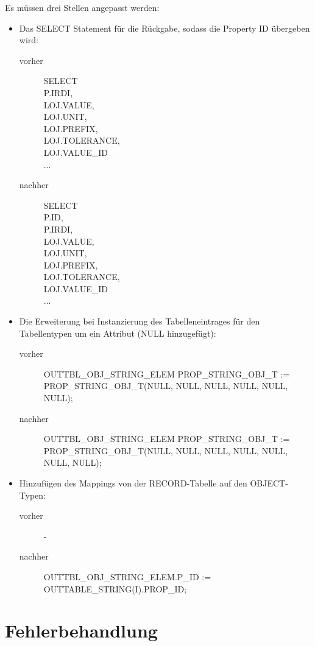 Es müssen drei Stellen angepasst werden: 

\begin{itemize}
\item Das SELECT Statement für die Rückgabe, sodass die Property ID übergeben wird: 
  \begin{description}
  \item[vorher] SELECT \\
  P.IRDI, \\
  LOJ.VALUE, \\ 
  LOJ.UNIT, \\
  LOJ.PREFIX, \\ 
  LOJ.TOLERANCE, \\
  LOJ.VALUE\_ID \\
  ...
  \item[nachher] SELECT \\
  P.ID, \\
  P.IRDI, \\ 
  LOJ.VALUE, \\ 
  LOJ.UNIT, \\
  LOJ.PREFIX, \\ 
  LOJ.TOLERANCE, \\ 
  LOJ.VALUE\_ID \\
  ...
  \end{description}
\item Die Erweiterung bei Instanzierung des Tabelleneintrages für den Tabellentypen um ein Attribut (NULL hinzugefügt): 
  \begin{description}
  \item[vorher] OUTTBL\_OBJ\_STRING\_ELEM  PROP\_STRING\_OBJ\_T :=  \\
  PROP\_STRING\_OBJ\_T(NULL, NULL, NULL, NULL, NULL, NULL);
  \item[nachher] OUTTBL\_OBJ\_STRING\_ELEM  PROP\_STRING\_OBJ\_T :=  \\
  PROP\_STRING\_OBJ\_T(NULL, NULL, NULL, NULL, NULL, NULL, NULL);
  \end{description}
\item Hinzufügen des Mappings von der RECORD-Tabelle auf den OBJECT-Typen:
  \begin{description}
  \item[vorher] -
  \item[nachher] OUTTBL\_OBJ\_STRING\_ELEM.P\_ID := OUTTABLE\_STRING(I).PROP\_ID;  
  \end{description}
\end{itemize}
 
\section{Fehlerbehandlung}

